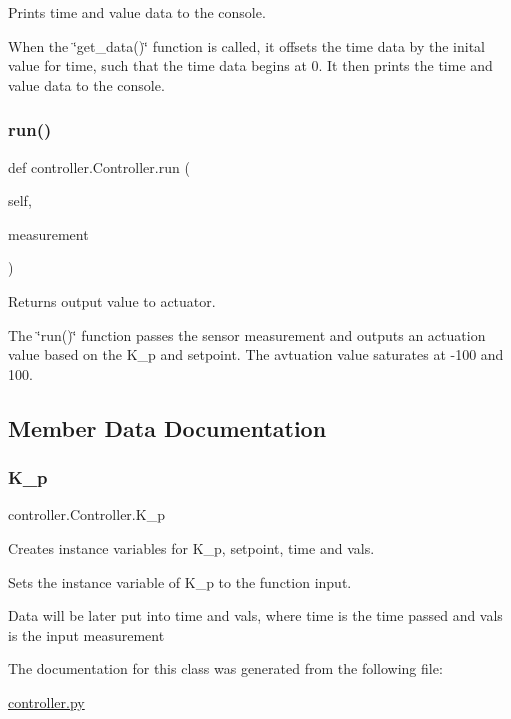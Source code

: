 Prints time and value data to the console. 

When the \char`\"{}get\+\_\+data()\char`\"{} function is called, it offsets the time data by the inital value for time, such that the time data begins at 0. It then prints the time and value data to the console. \mbox{\label{classcontroller_1_1_controller_a960dfc22275e951cf58fb9902460cc83}} 
\subsubsection{\texorpdfstring{run()}{run()}}
{\footnotesize\ttfamily def controller.\+Controller.\+run (\begin{DoxyParamCaption}\item[{}]{self,  }\item[{}]{measurement }\end{DoxyParamCaption})}



Returns output value to actuator. 

The \char`\"{}run()\char`\"{} function passes the sensor measurement and outputs an actuation value based on the K\+\_\+p and setpoint. The avtuation value saturates at -\/100 and 100. 

\subsection{Member Data Documentation}
\mbox{\label{classcontroller_1_1_controller_a6147d7f8aa12e56ef01036ddd2b55ee9}} 
\subsubsection{\texorpdfstring{K\_p}{K\_p}}
{\footnotesize\ttfamily controller.\+Controller.\+K\+\_\+p}



Creates instance variables for K\+\_\+p, setpoint, time and vals. 

Sets the instance variable of K\+\_\+p to the function input.

Data will be later put into time and vals, where time is the time passed and vals is the input measurement 

The documentation for this class was generated from the following file\+:\begin{DoxyCompactItemize}
\item 
\mbox{\hyperlink{controller_8py}{controller.\+py}}\end{DoxyCompactItemize}
